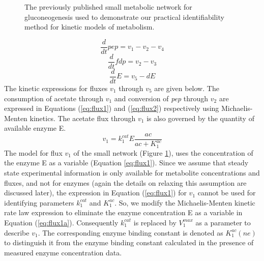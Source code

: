 \documentclass[10pt]{article}
\begin{document}
	\begin{figure}[!tbhp]
		\caption{The previously published small metabolic network for gluconeogenesis used to demonstrate our practical identifiability method for kinetic models of metabolism.}\label{fig:network}
	\end{figure}		
	
	\begin{equation}\label{eq:ode1}
	\frac{d}{dt}pep=v_1-v_2-v_4
	\end{equation}
	\begin{equation}\label{eq:ode2}
	\frac{d}{dt}fdp=v_2-v_3
	\end{equation}
	\begin{equation}\label{eq:ode3}
	\frac{d}{dt}E=v_5 - d E
	\end{equation}
	The kinetic expressions for fluxes $v_1$ through $v_5$ are given below. The consumption of acetate through $v_1$ and conversion of \textit{pep} through $v_2$ are expressed in Equations (\ref{eq:flux1}) and (\ref{eq:flux2}) respectively using Michaelis-Menten kinetics. The acetate flux through $v_1$ is also governed by the quantity of available enzyme E. 
	\begin{equation}\label{eq:flux1}
	v_1 = k_{1}^{cat}E\frac{ac}{ac+K_{1}^{ac}}
	\end{equation}		
	The model for flux $v_1$ of the small network (Figure \ref{fig:network}), uses the concentration of the enzyme E as a variable (Equation \ref{eq:flux1}). Since we assume that steady state experimental information is only available for metabolite concentrations and fluxes, and not for enzymes (again the details on relaxing this assumption are discussed later), the expression in Equation (\ref{eq:flux1}) for $v_1$ cannot be used for identifying parameters $k_1^{cat}$ and $K_1^{ac}$. So, we modify the Michaelis-Menten kinetic rate law expression to eliminate the enzyme concentration E as a variable in Equation (\ref{eq:flux1a}). Consequently $k_1^{cat}$ is replaced by $V_1^{max}$ as a parameter to describe $v_1$. The corresponding enzyme binding constant is denoted as $K_1^{ac} (ne)$ to distinguish it from the enzyme binding constant calculated in the presence of measured enzyme concentration data.
\end{document}
